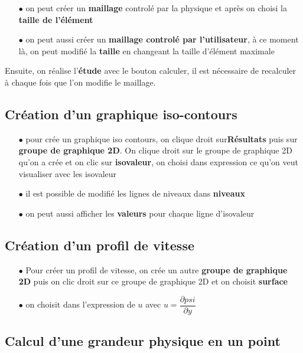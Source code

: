 \documentclass[a4paper,11pt]{report} %
\begin{document}
\begin{itemize}
    \item[$\bullet$]on peut créer un \textbf{maillage} controlé par la physique et après on choisi la \textbf{taille de l'élément}
    \item[$\bullet$] on peut aussi créer un \textbf{maillage controlé par l'utilisateur}, à ce moment là, on peut modifié la \textbf{taille} en changeant la taille d'élément maximale
\end{itemize}

Ensuite, on réalise l'\textbf{étude} avec le bouton calculer, il est nécessaire de recalculer à chaque fois que l'on modifie le maillage.

\subsection{Création d'un graphique iso-contours}

\begin{itemize}
    \item[$\bullet$]pour crée un graphique iso contours, on clique droit sur\textbf{Résultats} puis sur \textbf{groupe de graphique 2D}. On clique droit sur le groupe de graphique 2D qu'on a crée et on clic sur \textbf{isovaleur}, on choisi dans expression ce qu'on veut visualiser avec les isovaleur
    \item[$\bullet$] il est possible de modifié les lignes de niveaux dans \textbf{niveaux}
    \item[$\bullet$]on peut aussi afficher les \textbf{valeurs} pour chaque ligne d'isovaleur
\end{itemize}

\subsection{Création d'un profil de vitesse}

\begin{itemize}
    \item[$\bullet$]Pour créer un profil de vitesse, on crée un autre \textbf{groupe de graphique 2D} puis on clic droit sur ce groupe de graphique 2D et on choisit \textbf{surface}
    \item[$\bullet$] on choisit dans l'expression de $u$ avec $u=\dfrac{\partial psi}{\partial y}$
\end{itemize}

\subsection{Calcul d'une grandeur physique en un point}
\end{document}
